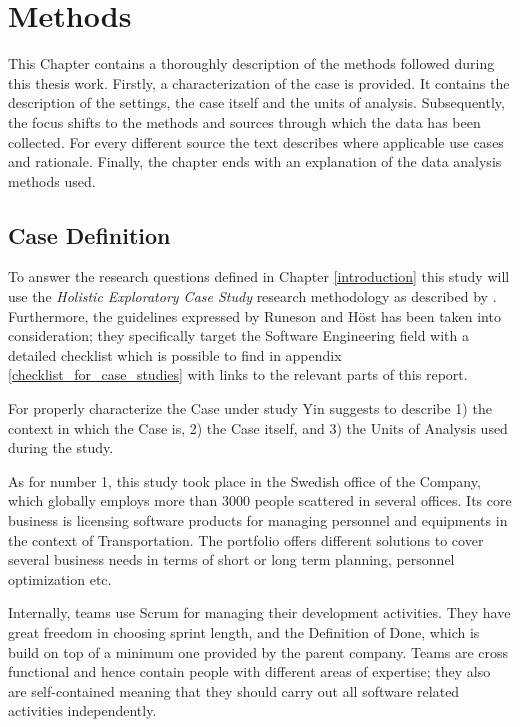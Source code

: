\chapter{Methods} \label{methods}
This Chapter contains a thoroughly description of the methods followed during this thesis work. Firstly, a characterization of the case is provided. It contains the description of the settings, the case itself and the units of analysis. Subsequently, the focus shifts to the methods and sources through which the data has been collected. For every different source the text describes where applicable use cases and rationale. Finally, the chapter ends with an explanation of the data analysis methods used. 


%
%
%
%
\section{Case Definition}	\label{case-description}
To answer the research questions defined in Chapter \ref{introduction} this study will use the \textit{Holistic Exploratory Case Study} research methodology as described by \cite{case_study_guide}. Furthermore, the guidelines expressed by Runeson and H{\"o}st \cite{case_study_software_engineering} has been taken into consideration; they specifically target the Software Engineering field with a detailed checklist which is possible to find in appendix \ref{checklist_for_case_studies} with links to the relevant parts of this report.


For properly characterize the Case under study Yin \cite{case_study_guide} suggests to describe 1) the context in which the Case is, 2) the Case itself, and 3) the Units of Analysis used during the study.

As for number 1, this study took place in the Swedish office of the Company, which globally employs more than 3000 people scattered in several offices. Its core business is licensing software products for managing personnel and equipments in the context of Transportation. The portfolio offers different solutions to cover several business needs in terms of short or long term planning, personnel optimization etc.

Internally, teams use Scrum for managing their development activities. They have great freedom in choosing sprint length, and the Definition of Done, which is build on top of a minimum one provided by the parent company. Teams are cross functional and hence contain people with different areas of expertise; they also are self-contained meaning that they should carry out all software related activities independently.


